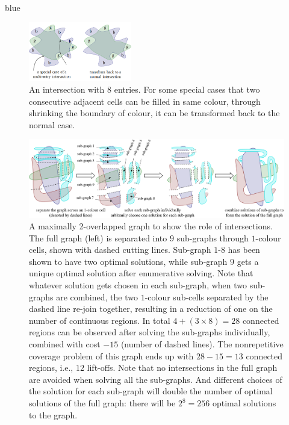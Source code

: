 \documentclass[journal]{IEEEtran}
\begin{document}
\begin{color}{blue}
\begin{figure}[t]
\centering
\includegraphics[width = 0.4\textwidth]{figures/multi_entry}
\caption{An intersection with $8$ entries. For some special cases that two consecutive adjacent cells can be filled in same colour, through shrinking the boundary of colour, it can be transformed back to the normal case. }\label{fig:multi_entry}
\end{figure}

\begin{figure}[t]
\centering
\includegraphics[width=\textwidth]{figures/two_overlapped_graph_2}
\caption{A maximally 2-overlapped graph to show the role of intersections. The full graph (left) is separated into $9$ sub-graphs through $1$-colour cells, shown with dashed cutting lines. Sub-graph $1$-$8$ has been shown to have two optimal solutions, while sub-graph $9$ gets a unique optimal solution after enumerative solving. Note that whatever solution gets chosen in each sub-graph, when two sub-graphs are combined, the two $1$-colour sub-cells separated by the dashed line re-join together, resulting in a reduction of one on the number of continuous regions. In total $4+(3\times 8)=28$ connected regions can be observed after solving the sub-graphs individually, combined with cost $-15$ (number of dashed lines). The nonrepetitive coverage problem of this graph ends up with $28-15=13$ connected regions, i.e., $12$ lift-offs. 
Note that no intersections in the full graph are avoided when solving all the sub-graphs. And different choices of the solution for each sub-graph will double the number of optimal solutions of the full graph: there will be $2^8=256$ optimal solutions to the graph.
}
\label{fig:two_overlapped_graph}
\end{figure}



\end{color}
\end{document}
